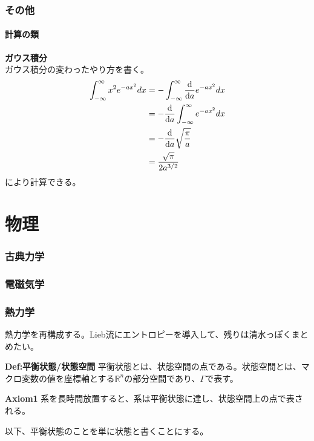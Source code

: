 \documentclass[a4paper,11pt]{jsarticle}
\numberwithin{equation}{section}
\begin{document}
\section{その他}
\subsection{計算の類}
\textbf{ガウス積分}\\
ガウス積分の変わったやり方を書く。\\
\begin{align}
  \int_{-\infty}^{\infty} x^2 e^{-ax^2} dx
  &=-\int_{-\infty}^{\infty} \dv{a} e^{-ax^2} dx\\
  &=-\dv{a} \int_{-\infty}^{\infty} e^{-ax^2} dx\\
  &=-\dv{a} \sqrt{\frac{\pi}{a}}\\
  &=\frac{\sqrt{\pi}}{2a^{3/2}}
\end{align}
により計算できる。\\

\part{物理}
\section{古典力学}

\section{電磁気学}

\section{熱力学}
熱力学を再構成する。Lieb流にエントロピーを導入して、残りは清水っぽくまとめたい。\\

\begin{itembox}[l]{\textbf{Def:平衡状態/状態空間}}
  平衡状態とは、状態空間の点である。状態空間とは、マクロ変数の値を座標軸とする$\mathbb{R}^n$の部分空間であり、$\Gamma$で表す。
\end{itembox}

\begin{itembox}[l]{\textbf{Axiom1}}
  系を長時間放置すると、系は平衡状態に達し、状態空間上の点で表される。
\end{itembox}

以下、平衡状態のことを単に状態と書くことにする。\\
\end{document}
